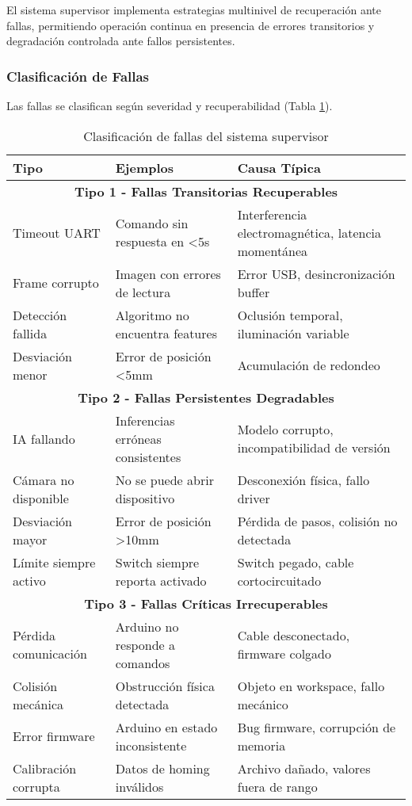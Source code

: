 El sistema supervisor implementa estrategias multinivel de recuperación ante fallas, permitiendo operación continua en presencia de errores transitorios y degradación controlada ante fallos persistentes.

\subsubsection{Clasificación de Fallas}

Las fallas se clasifican según severidad y recuperabilidad (Tabla \ref{tab:clasificacion_fallas}).

\begin{table}[H]
\centering
\caption{Clasificación de fallas del sistema supervisor}
\label{tab:clasificacion_fallas}
\small
\begin{tabular}{|l|p{6cm}|p{5cm}|}
\hline
\textbf{Tipo} & \textbf{Ejemplos} & \textbf{Causa Típica} \\
\hline
\multicolumn{3}{|c|}{\textbf{Tipo 1 - Fallas Transitorias Recuperables}} \\
\hline
Timeout UART & Comando sin respuesta en <5s & Interferencia electromagnética, latencia momentánea \\
\hline
Frame corrupto & Imagen con errores de lectura & Error USB, desincronización buffer \\
\hline
Detección fallida & Algoritmo no encuentra features & Oclusión temporal, iluminación variable \\
\hline
Desviación menor & Error de posición <5mm & Acumulación de redondeo \\
\hline
\multicolumn{3}{|c|}{\textbf{Tipo 2 - Fallas Persistentes Degradables}} \\
\hline
IA fallando & Inferencias erróneas consistentes & Modelo corrupto, incompatibilidad de versión \\
\hline
Cámara no disponible & No se puede abrir dispositivo & Desconexión física, fallo driver \\
\hline
Desviación mayor & Error de posición >10mm & Pérdida de pasos, colisión no detectada \\
\hline
Límite siempre activo & Switch siempre reporta activado & Switch pegado, cable cortocircuitado \\
\hline
\multicolumn{3}{|c|}{\textbf{Tipo 3 - Fallas Críticas Irrecuperables}} \\
\hline
Pérdida comunicación & Arduino no responde a comandos & Cable desconectado, firmware colgado \\
\hline
Colisión mecánica & Obstrucción física detectada & Objeto en workspace, fallo mecánico \\
\hline
Error firmware & Arduino en estado inconsistente & Bug firmware, corrupción de memoria \\
\hline
Calibración corrupta & Datos de homing inválidos & Archivo dañado, valores fuera de rango \\
\hline
\end{tabular}
\end{table}

